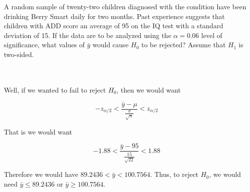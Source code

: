 A random sample of twenty-two children diagnosed with the condition have been drinking Berry Smart daily
for two months. Past experience suggests that children with ADD score an average of 95 on the IQ test
with a standard deviation of 15. If the data are to be analyzed using the $\alpha=0.06$ level of
significance, what values of $\bar{y}$ would cause $H_0$ to be rejected? Assume that $H_1$ is
two-sided.\\\\

\begin{solution}\renewcommand{\qedsymbol}{}\ \\
    Well, if we wanted to fail to reject $H_0$, then we would want
    
    $$-z_{\alpha/2}<\frac{\bar{y}-\mu}{\frac{\sigma}{\sqrt{n}}}<z_{\alpha/2}$$
    
    That is we would want
    
    $$-1.88<\frac{\bar{y}-95}{\frac{15}{\sqrt{22}}}<1.88$$
    
    Therefore we would have $89.2436<\bar{y}<100.7564$. Thus, to reject $H_0$, we would need
    $\bar{y}\leq89.2436$ or $\bar{y}\geq100.7564$.

\end{solution}